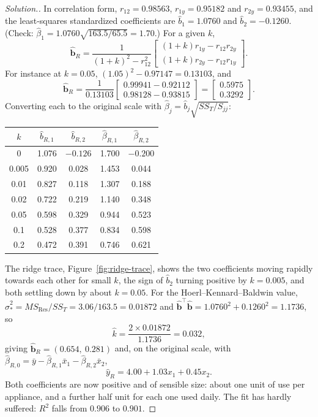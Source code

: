 \documentclass[11pt,a4paper]{article}
\numberwithin{equation}{section}
\theoremstyle{definition}
\newenvironment{solution}
  {\renewcommand{\qedsymbol}{}\begin{proof}[\textit{Solution}.]}
  {\end{proof}}
\begin{document}
\begin{solution}
In correlation form, $r_{12} = 0.98563$, $r_{1y} = 0.95182$ and $r_{2y} = 0.93455$, and the
least-squares standardized coefficients are $\hat b_1 = 1.0760$ and $\hat b_2 = -0.1260$. (Check:
$\hat\beta_1 = 1.0760\sqrt{163.5/65.5} = 1.70$.) For a given $k$,
\[
\hat{\mathbf{b}}_R = \frac{1}{(1 + k)^2 - r_{12}^2}\begin{bmatrix} (1 + k)r_{1y} - r_{12}r_{2y} \\ (1 + k)r_{2y} - r_{12}r_{1y} \end{bmatrix} .
\]
For instance at $k = 0.05$, $(1.05)^2 - 0.97147 = 0.13103$, and
\[
\hat{\mathbf{b}}_R = \frac{1}{0.13103}\begin{bmatrix} 0.99941 - 0.92112 \\ 0.98128 - 0.93815 \end{bmatrix}
= \begin{bmatrix} 0.5975 \\ 0.3292 \end{bmatrix} .
\]
Converting each to the original scale with $\hat\beta_j = \hat b_j\sqrt{SS_T/S_{jj}}$:
\begin{center}
\begin{tabular}{c|cc|cc}
$k$ & $\hat b_{R,1}$ & $\hat b_{R,2}$ & $\hat\beta_{R,1}$ & $\hat\beta_{R,2}$ \\
\hline
0 & 1.076 & $-0.126$ & 1.700 & $-0.200$ \\
0.005 & 0.920 & 0.028 & 1.453 & 0.044 \\
0.01 & 0.827 & 0.118 & 1.307 & 0.188 \\
0.02 & 0.722 & 0.219 & 1.140 & 0.348 \\
0.05 & 0.598 & 0.329 & 0.944 & 0.523 \\
0.1 & 0.528 & 0.377 & 0.834 & 0.598 \\
0.2 & 0.472 & 0.391 & 0.746 & 0.621 \\
\end{tabular}
\end{center}
The ridge trace, Figure~\ref{fig:ridge-trace}, shows the two coefficients moving rapidly towards each
other for small $k$, the sign of $\hat b_2$ turning positive by $k = 0.005$, and both settling down by
about $k = 0.05$. For the Hoerl--Kennard--Baldwin value, $\hat\sigma_*^2 = MS_{\mathrm{Res}}/SS_T = 3.06/163.5 = 0.01872$
and $\hat{\mathbf{b}}^\top\hat{\mathbf{b}} = 1.0760^2 + 0.1260^2 = 1.1736$, so
\[
\hat k = \frac{2 \times 0.01872}{1.1736} = 0.032 ,
\]
giving $\hat{\mathbf{b}}_R = (0.654,\ 0.281)$ and, on the original scale, with
$\hat\beta_{R,0} = \bar y - \hat\beta_{R,1}\bar x_1 - \hat\beta_{R,2}\bar x_2$,
\[
\hat y_R = 4.00 + 1.03x_1 + 0.45x_2 .
\]
Both coefficients are now positive and of sensible size: about one unit of use per appliance, and a
further half unit for each one used daily. The fit has hardly suffered: $R^2$ falls from $0.906$ to
$0.901$.


\end{solution}
\end{document}
